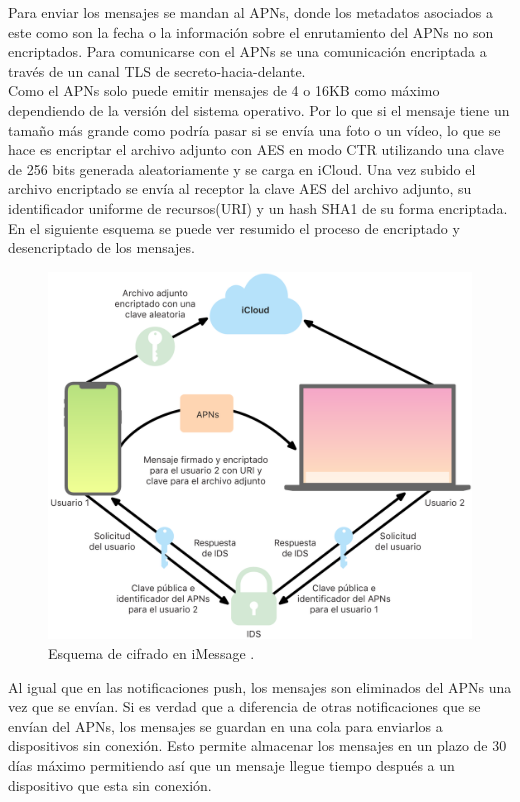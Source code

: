 Para enviar los mensajes se mandan al APNs, donde los metadatos asociados a este como son la fecha o la información sobre el enrutamiento del APNs no son encriptados. Para comunicarse con el APNs se una comunicación encriptada a través de un canal TLS de secreto-hacia-delante.\\
Como el APNs solo puede emitir mensajes de 4 o 16KB como máximo dependiendo de la versión del sistema operativo. Por lo que si el mensaje tiene un tamaño más grande como podría pasar si se envía una foto o un vídeo, lo que se hace es encriptar el archivo adjunto con AES en modo CTR utilizando una clave de 256 bits generada aleatoriamente y se carga en iCloud. Una vez subido el archivo encriptado se envía al receptor la clave AES del archivo adjunto, su identificador uniforme de recursos(URI) y un hash SHA1 de su forma encriptada.\\
En el siguiente esquema se puede ver resumido el proceso de encriptado y desencriptado de los mensajes.
\begin{figure}[htb]
	\centering
	\includegraphics[scale=0.15]{imagenes/apple.png} 
	\caption{Esquema de cifrado en iMessage \cite{apple1}.}
	\label{iMessagefoto}
\end{figure}

Al igual que en las notificaciones push, los mensajes son eliminados del APNs una vez que se envían. Si es verdad que a diferencia de otras notificaciones que se envían del APNs, los mensajes se guardan en una cola para enviarlos a dispositivos sin conexión. Esto permite almacenar los mensajes en un plazo de 30 días máximo permitiendo así que un mensaje llegue tiempo después a un dispositivo que esta sin conexión.

